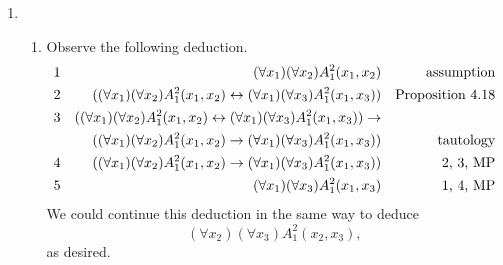 \begin{enumerate}
  \item %
    \begin{enumerate}
      \item Observe the following deduction.
        \begin{align*}
          \text{1}&&
          (\forall x_1)(\forall x_2)A^2_1(x_1, x_2)&&
          \text{assumption}\\
          \text{2}&&
          ((\forall x_1)(\forall x_2)A^2_1(x_1, x_2) \leftrightarrow (\forall x_1)(\forall x_3)A^2_1(x_1, x_3))&&
          \text{Proposition 4.18}\\
          \text{3}&&
          ((\forall x_1)(\forall x_2)A^2_1(x_1, x_2) \leftrightarrow (\forall x_1)(\forall x_3)A^2_1(x_1, x_3)) \rightarrow&&
          \\
          &&
          ((\forall x_1)(\forall x_2)A^2_1(x_1, x_2) \rightarrow (\forall x_1)(\forall x_3)A^2_1(x_1, x_3))&&
          \text{tautology}\\
          \text{4}&&
          ((\forall x_1)(\forall x_2)A^2_1(x_1, x_2) \rightarrow (\forall x_1)(\forall x_3)A^2_1(x_1, x_3))&&
          \text{2, 3, MP}\\
          \text{5}&&
          (\forall x_1)(\forall x_3)A^2_1(x_1, x_3)&&
          \text{1, 4, MP}
        \end{align*}
        We could continue this deduction in the same way to deduce
          \[(\forall x_2)(\forall x_3)A^2_1(x_2, x_3),\]
        as desired.


\end{enumerate}
\end{enumerate}
